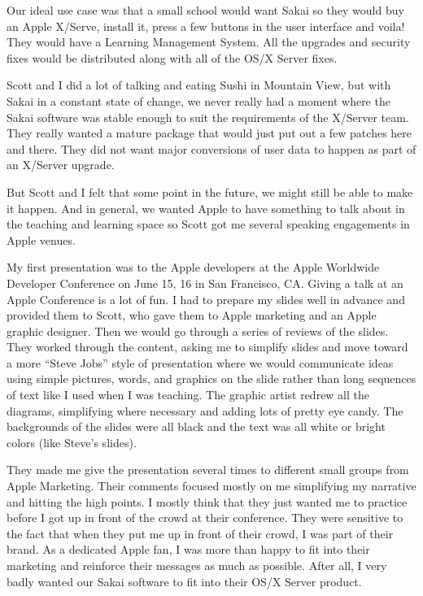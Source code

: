 \documentclass[12pt]{book}
\begin{document}
Our ideal use case was that a small school would want Sakai
so they would buy an Apple X/Serve, install it, press a few
buttons in the user interface and voila!  They would have a
Learning Management System.   All the upgrades and security
fixes would be distributed along with all of the OS/X Server
fixes.

Scott and I did a lot of talking and eating Sushi in Mountain
View, but with Sakai in a constant state of change, we never
really had a moment where the Sakai software was stable enough
to suit the requirements of the X/Server team.  They really
wanted a mature package that would just put out a few patches
here and there.  They did not want major conversions of
user data to happen as part of an X/Server upgrade.

But Scott and I felt that some point in the future, we
might still be able to make it happen.  And in general, we
wanted Apple to have something to talk about in the teaching
and learning space so Scott got me several speaking engagements
in Apple venues.

My first presentation was to the Apple developers at the Apple
Worldwide Developer Conference on June 15, 16 in San Francisco,
CA.  Giving a talk at an Apple Conference is a lot of fun.
I had to prepare my slides well in advance and provided them
to Scott, who gave them to Apple marketing and an Apple graphic designer.  Then
we would go through a series of reviews of the slides.  They
worked through the content, asking me to simplify slides and
move toward a more ``Steve Jobs'' style of presentation where
we would communicate ideas using simple pictures, words, and
graphics on the slide rather than long sequences of text
like I used when I was teaching.  The graphic artist redrew
all the diagrams, simplifying where necessary and adding lots of
pretty eye candy.  The backgrounds of the slides were all black
and the text was all white or bright colors (like Steve's slides).

They made me give the presentation several times to different
small groups from Apple Marketing.  Their comments focused mostly
on me simplifying my narrative and hitting the high points.
I mostly think that they just wanted me to practice before
I got up in front of the crowd at their conference.  They were
sensitive to the fact that when they put me up in front
of their crowd, I was part of their brand.  As a dedicated Apple
fan, I was more than happy to fit into their marketing and
reinforce their messages as much as possible.  After all,
I very badly wanted our Sakai software to fit into their OS/X
Server product.
\end{document}
